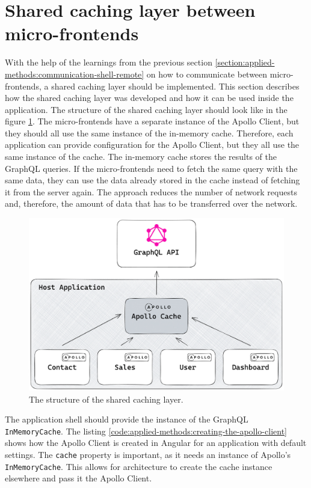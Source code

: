 \section{Shared caching layer between micro-frontends}\label{section:applied-methods:shared-caching-layer}

\noindent With the help of the learnings from the previous section \ref{section:applied-methods:communication-shell-remote} on how to communicate between micro-frontends, a shared caching layer should be implemented. This section describes how the shared caching layer was developed and how it can be used inside the application. The structure of the shared caching layer should look like in the figure \ref{fig:applied-methods:structure-shared-caching-layer}. The micro-frontends have a separate instance of the Apollo Client, but they should all use the same instance of the in-memory cache. Therefore, each application can provide configuration for the Apollo Client, but they all use the same instance of the cache. The in-memory cache stores the results of the GraphQL queries. If the micro-frontends need to fetch the same query with the same data, they can use the data already stored in the cache instead of fetching it from the server again. The approach reduces the number of network requests and, therefore, the amount of data that has to be transferred over the network. 

\ifshowImages
  \begin{figure}[H]
  \centering
  \includegraphics[width=0.8\linewidth]{images/applied-methods/shared-caching-layer/shared-caching-layer.jpg}
  \caption{The structure of the shared caching layer.}\label{fig:applied-methods:structure-shared-caching-layer}
  \end{figure}
\fi

\noindent The application shell should provide the instance of the GraphQL \texttt{InMemoryCache}. The listing \ref{code:applied-methods:creating-the-apollo-client} shows how the Apollo Client is created in Angular for an application with default settings. The \texttt{cache} property is important, as it needs an instance of Apollo's \texttt{InMemoryCache}. This allows for architecture to create the cache instance elsewhere and pass it the Apollo Client. 

